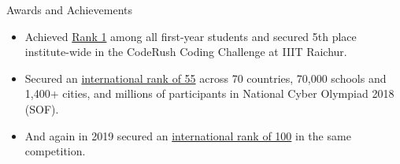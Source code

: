 \documentclass{resume}
\begin{document}

\begin{rSection}{Awards and Achievements}

    \begin{itemize}
        \itemsep -3pt {}
        \item Achieved \href{https://drive.google.com/file/d/1BdOPAlKCXyNEZf-ujJ5Iu8lBBra77hJg/view?usp=sharing}{Rank 1} among all first-year students and secured 5th place institute-wide in the CodeRush Coding Challenge at IIIT Raichur.
        \item Secured an \href{https://drive.google.com/file/d/1b_JE3MbNI2eW9xpYvC1NWCfUGChuEVBy/view?usp=sharing}{international rank of 55} across 70 countries, 70,000 schools and 1,400+ cities, and millions of participants in National Cyber Olympiad 2018 (SOF).
        \item And again in 2019 secured an \href{https://drive.google.com/file/d/1bnRRCB6FZKDpJm0-Ogz15o56iG2QN_1t/view?usp=sharing}{international rank of 100} in the same competition.
    \end{itemize}

\end{rSection}

\end{document}
